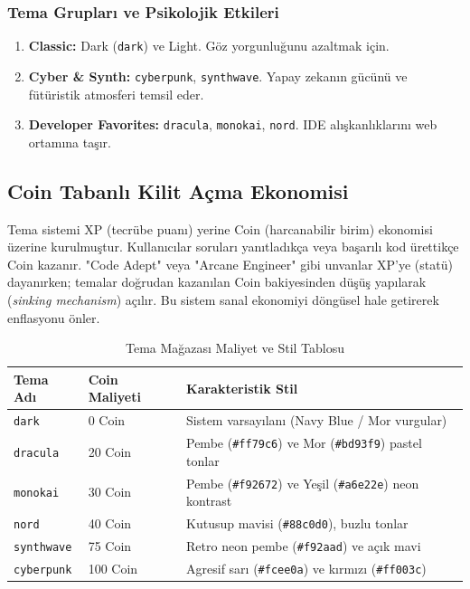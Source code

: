 \documentclass[12pt,a4paper]{article}
\begin{document}
\subsubsection{Tema Grupları ve Psikolojik Etkileri}
\begin{enumerate}
    \item \textbf{Classic:} Dark (\texttt{dark}) ve Light. Göz yorgunluğunu azaltmak için.
    \item \textbf{Cyber \& Synth:} \texttt{cyberpunk}, \texttt{synthwave}. Yapay zekanın gücünü ve fütüristik atmosferi temsil eder.
    \item \textbf{Developer Favorites:} \texttt{dracula}, \texttt{monokai}, \texttt{nord}. IDE alışkanlıklarını web ortamına taşır.
\end{enumerate}

\subsection{Coin Tabanlı Kilit Açma Ekonomisi}
Tema sistemi XP (tecrübe puanı) yerine Coin (harcanabilir birim) ekonomisi üzerine kurulmuştur. Kullanıcılar soruları yanıtladıkça veya başarılı kod ürettikçe Coin kazanır. "Code Adept" veya "Arcane Engineer" gibi unvanlar XP'ye (statü) dayanırken; temalar doğrudan kazanılan Coin bakiyesinden düşüş yapılarak (\textit{sinking mechanism}) açılır. Bu sistem sanal ekonomiyi döngüsel hale getirerek enflasyonu önler.

\begin{table}[h!]
  \centering\small
  \begin{tabular}{@{} P{3cm} P{3cm} P{7cm} @{}}
    \toprule
    \textbf{Tema Adı} & \textbf{Coin Maliyeti} & \textbf{Karakteristik Stil} \\
    \midrule
    \texttt{dark}      & 0 Coin & Sistem varsayılanı (Navy Blue / Mor vurgular) \\
    \texttt{dracula}   & 20 Coin & Pembe (\texttt{\#ff79c6}) ve Mor (\texttt{\#bd93f9}) pastel tonlar \\
    \texttt{monokai}   & 30 Coin & Pembe (\texttt{\#f92672}) ve Yeşil (\texttt{\#a6e22e}) neon kontrast \\
    \texttt{nord}      & 40 Coin & Kutusup mavisi (\texttt{\#88c0d0}), buzlu tonlar \\
    \texttt{synthwave} & 75 Coin & Retro neon pembe (\texttt{\#f92aad}) ve açık mavi \\
    \texttt{cyberpunk} & 100 Coin & Agresif sarı (\texttt{\#fcee0a}) ve kırmızı (\texttt{\#ff003c}) \\
    \bottomrule
  \end{tabular}
  \caption{Tema Mağazası Maliyet ve Stil Tablosu}
\end{table}
\end{document}
